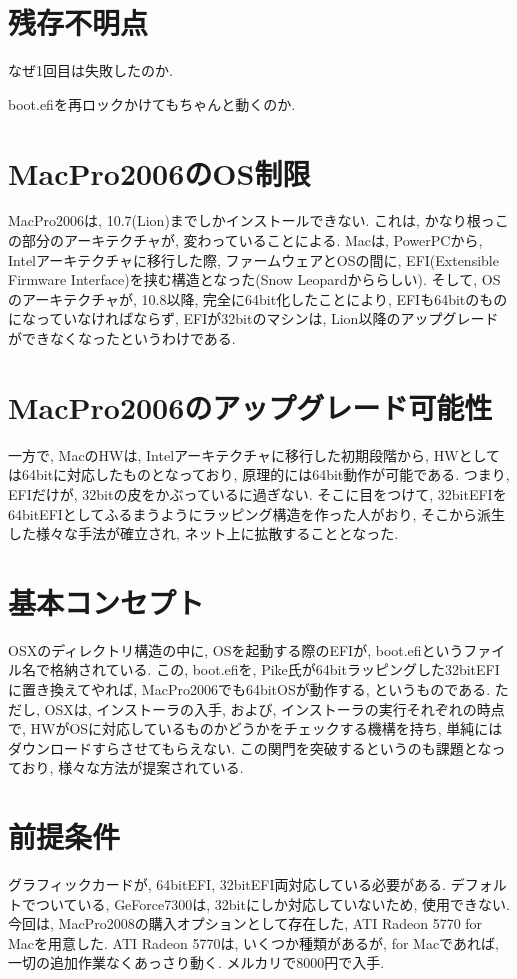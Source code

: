\documentclass{jsarticle}
\begin{document}
\section{残存不明点}
なぜ1回目は失敗したのか. 

boot.efiを再ロックかけてもちゃんと動くのか. 

\section{MacPro2006のOS制限}
MacPro2006は, 10.7(Lion)までしかインストールできない\cite{EFI_Issue_Doc}. これは, かなり根っこの部分のアーキテクチャが, 変わっていることによる. 
Macは, PowerPCから, Intelアーキテクチャに移行した際, ファームウェアとOSの間に, EFI(Extensible Firmware Interface)を挟む構造となった(Snow Leopardかららしい). 
そして, OSのアーキテクチャが, 10.8以降, 完全に64bit化した\cite{EFI_Issue_Doc}ことにより, EFIも64bitのものになっていなければならず, EFIが32bitのマシンは, Lion以降のアップグレードができなくなったというわけである. 

\section{MacPro2006のアップグレード可能性}
一方で, MacのHWは, Intelアーキテクチャに移行した初期段階から, HWとしては64bitに対応したものとなっており\cite{MacPro_Doc}, 原理的には64bit動作が可能である. 
つまり, EFIだけが, 32bitの皮をかぶっているに過ぎない. そこに目をつけて, 32bitEFIを64bitEFIとしてふるまうようにラッピング構造を作った人がおり\cite{Pike}, 
そこから派生した様々な手法が確立され, ネット上に拡散することとなった. 

\section{基本コンセプト}
OSXのディレクトリ構造の中に, OSを起動する際のEFIが, boot.efiというファイル名で格納されている. 
この, boot.efiを, Pike氏が64bitラッピングした32bitEFIに置き換えてやれば, MacPro2006でも64bitOSが動作する, というものである. 
ただし, OSXは, インストーラの入手, および, インストーラの実行それぞれの時点で, HWがOSに対応しているものかどうかをチェックする機構を持ち, 単純にはダウンロードすらさせてもらえない. 
この関門を突破するというのも課題となっており, 様々な方法が提案されている. 

\section{前提条件}
グラフィックカードが, 64bitEFI, 32bitEFI両対応している必要がある. 
デフォルトでついている, GeForce7300は, 32bitにしか対応していないため, 使用できない\cite{Graphics_Board_Doc}. 
今回は, MacPro2008の購入オプションとして存在した, ATI Radeon 5770 for Macを用意した. ATI Radeon 5770は, いくつか種類がある\cite{Alternative_GPU}が, for Macであれば, 一切の追加作業なくあっさり動く. メルカリで8000円で入手. 
\end{document}
